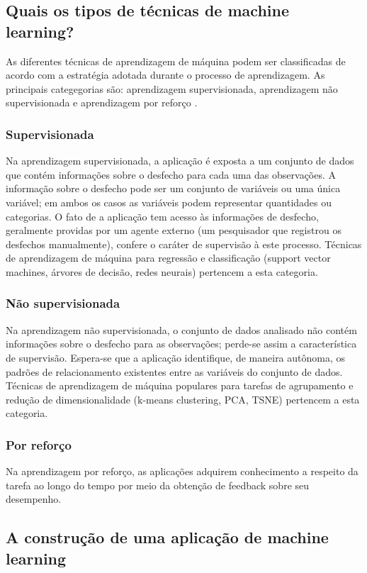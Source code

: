 \subsection{Quais os tipos de técnicas de machine learning?}
As diferentes técnicas de aprendizagem de máquina podem ser classificadas de acordo com a estratégia adotada
durante o processo de aprendizagem. As principais categegorias são: aprendizagem supervisionada, aprendizagem não
supervisionada e aprendizagem por reforço \cite{Bi2019}.

\subsubsection{Supervisionada}
Na aprendizagem supervisionada, a aplicação é exposta a um conjunto de dados que contém informações sobre o desfecho
para cada uma das observações. A informação sobre o desfecho pode ser um conjunto de variáveis ou uma única variável;
em ambos os casos as variáveis podem representar quantidades ou categorias. O fato de a aplicação tem acesso às informações
de desfecho, geralmente providas por um agente externo (um pesquisador que registrou os desfechos manualmente), confere o
caráter de supervisão à este processo. Técnicas de aprendizagem de máquina para regressão e classificação (support vector
machines, árvores de decisão, redes neurais) pertencem a esta categoria.

\subsubsection{Não supervisionada}
Na aprendizagem não supervisionada, o conjunto de dados analisado não contém informações sobre o desfecho para
as observações; perde-se assim a característica de supervisão. Espera-se que a aplicação identifique, de maneira
autônoma, os padrões de relacionamento existentes entre as variáveis do conjunto de dados. Técnicas de aprendizagem de
máquina populares para tarefas de agrupamento e redução de dimensionalidade (k-means clustering, PCA, TSNE) pertencem
a esta categoria.

\subsubsection{Por reforço}
Na aprendizagem por reforço, as aplicações adquirem conhecimento a respeito da tarefa ao longo do tempo por meio da obtenção
de feedback sobre seu desempenho.

\subsection{A construção de uma aplicação de machine learning}

